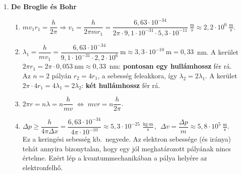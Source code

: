 \documentclass[11pt,a4paper]{article}
\begin{document}
\begin{enumerate}
\item \textbf{De Broglie és Bohr}
  \begin{enumerate}
    \item $mv_1r_1 = \dfrac{h}{2\pi} \Rightarrow v_1 = \dfrac{h}{2\pi m r_1} =
      \dfrac{6{,}63\cdot 10^{-34}}{2\pi\cdot 9{,}1\cdot 10^{-31}\cdot 5{,}3\cdot
      10^{-11}}~\tfrac{\text{m}}{\text{s}} \approx 2{,}2\cdot 10^{6}~\tfrac{\text{m}}{\text{s}}$.
    \item $\lambda_1 = \dfrac{h}{mv_1} = \dfrac{6{,}63\cdot 10^{-34}}{9{,}1\cdot 10^{-31}\cdot
      2{,}2\cdot 10^{6}}~\text{m} \approx 3{,}3\cdot 10^{-10}~\text{m} = 0{,}33$~nm.
      A kerület $2\pi r_1 = 2\pi\cdot 0{,}053~\text{nm} \approx 0{,}33$~nm: \textbf{pontosan
      egy hullámhossz} fér rá.\\
      Az $n=2$ pályán $r_2 = 4r_1$, a sebesség feleakkora, így $\lambda_2 = 2\lambda_1$. A kerület
      $2\pi\cdot 4r_1 = 4\lambda_1 = 2\lambda_2$: \textbf{két hullámhossz} fér rá.
    \item $2\pi r = n\lambda = n\dfrac{h}{mv} \;\Longleftrightarrow\; mvr = n\dfrac{h}{2\pi}$.
    \item $\Delta p \ge \dfrac{h}{4\pi\Delta x} = \dfrac{6{,}63\cdot 10^{-34}}{4\pi\cdot
      10^{-10}} \approx 5{,}3\cdot 10^{-25}~\tfrac{\text{kg}\cdot\text{m}}{\text{s}}$,
      $\;\Delta v = \dfrac{\Delta p}{m} \approx 5{,}8\cdot 10^{5}~\tfrac{\text{m}}{\text{s}}$.\\
      Ez a keringési sebesség kb.\ negyede. Az elektron sebessége (és iránya) tehát
      annyira bizonytalan, hogy egy jól meghatározott pályának nincs értelme. Ezért
      lép a kvantummechanikában a pálya helyére az elektronfelhő.
  \end{enumerate}


\end{enumerate}
\end{document}
